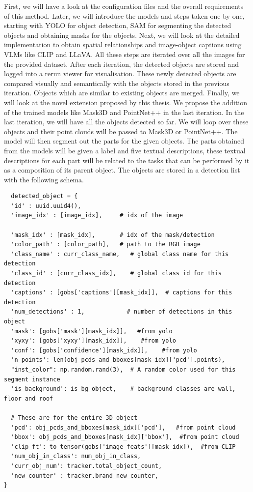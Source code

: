 First, we will have a look at the configuration files and the overall requirements of this method. Later, we will introduce the models and steps taken one by one, starting 
with YOLO for object detection, SAM for segmenting the detected objects and obtaining masks for the objects. Next, we will look at the detailed implementation to 
obtain spatial relationships and image-object captions using VLMs like CLIP and LLaVA. All these steps are iterated over all the images for the provided dataset. After each iteration, 
the detected objects are stored and logged into a rerun viewer for visualisation. These newly detected objects are compared visually and semantically with the 
objects stored in the previous iteration. Objects which are similar to existing objects are merged. Finally, we will look at the novel extension proposed by this thesis. 
We propose the addition of the trained models like Mask3D and PointNet++ in the last iteration. In the last iteration, we will have all the objects detected so far. We will
loop over these objects and their point clouds will be passed to Mask3D or PointNet++. The model will then segment out the parts for the given objects. The parts obtained from
the models will be given a label and five textual descriptions, these textual descriptions for each part will be related to the tasks that can be performed by it as a composition
of its parent object. The objects are stored in a detection list with the following schema. 
\begin{lstlisting}
  detected_object = {
  'id' : uuid.uuid4(), 
  'image_idx' : [image_idx],     # idx of the image
  
  'mask_idx' : [mask_idx],       # idx of the mask/detection
  'color_path' : [color_path],   # path to the RGB image
  'class_name' : curr_class_name,   # global class name for this detection
  'class_id' : [curr_class_idx],    # global class id for this detection
  'captions' : [gobs['captions'][mask_idx]],  # captions for this detection
  'num_detections' : 1,            # number of detections in this object
  'mask': [gobs['mask'][mask_idx]],   #from yolo
  'xyxy': [gobs['xyxy'][mask_idx]],    #from yolo
  'conf': [gobs['confidence'][mask_idx]],    #from yolo
  'n_points': len(obj_pcds_and_bboxes[mask_idx]['pcd'].points),                       
  "inst_color": np.random.rand(3),  # A random color used for this segment instance
  'is_background': is_bg_object,    # background classes are wall, floor and roof
  
  # These are for the entire 3D object
  'pcd': obj_pcds_and_bboxes[mask_idx]['pcd'],   #from point cloud
  'bbox': obj_pcds_and_bboxes[mask_idx]['bbox'],  #from point cloud
  'clip_ft': to_tensor(gobs['image_feats'][mask_idx]),  #from CLIP
  'num_obj_in_class': num_obj_in_class,
  'curr_obj_num': tracker.total_object_count,
  'new_counter' : tracker.brand_new_counter,
}
\end{lstlisting}

